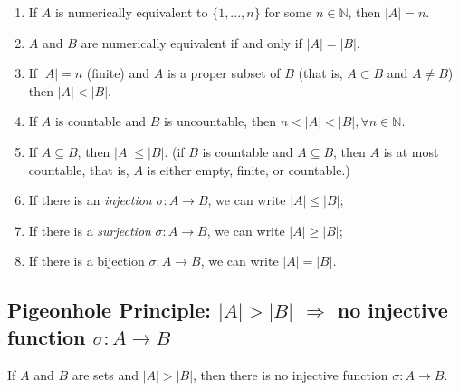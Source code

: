 \documentclass[11pt]{elegantbook}
\begin{document}
\begin{proposition}
    \begin{enumerate}
        \item If $A$ is numerically equivalent to $\{1,...,n\}$ for some $n\in \mathbb{N}$, then $|A|=n$.
        \item $A$ and $B$ are numerically equivalent if and only if $|A|=|B|$.
        \item If $|A| = n$ (finite) and $A$ is a proper subset of $B$ (that is, $A\subset B$ and $A \neq B$) then $|A|<|B|$.
        \item If $A$ is countable and $B$ is uncountable, then $n<|A|<|B|, \forall n\in\mathbb{N}$.
        \item If $A\subseteq B$, then $|A|\leq|B|$. (if $B$ is countable and $A\subseteq B$, then $A$ is at most countable, that is, $A$ is either empty, finite, or countable.)
        \item If there is an \textit{injection} $\sigma:A \rightarrow B$, we can write $|A|\leq|B|$;
        \item If there is a \textit{surjection} $\sigma:A \rightarrow B$, we can write $|A|\geq|B|$;
        \item If there is a bijection $\sigma:A \rightarrow B$, we can write $|A|=|B|$.
    \end{enumerate}
\end{proposition}

\subsection{Pigeonhole Principle: $|A|>|B|$ $\Rightarrow$ no injective function $\sigma:A \rightarrow B$}
\begin{theorem}
    If $A$ and $B$ are sets and $|A|>|B|$, then there is no injective function $\sigma:A \rightarrow B$.
\end{theorem}
\end{document}
